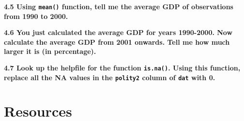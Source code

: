 \documentclass[]{book}
\newenvironment{Shaded}{\begin{snugshade}}{\end{snugshade}}
\newcommand{\KeywordTok}[1]{\textcolor[rgb]{0.13,0.29,0.53}{\textbf{#1}}}
\newcommand{\DataTypeTok}[1]{\textcolor[rgb]{0.13,0.29,0.53}{#1}}
\newcommand{\DecValTok}[1]{\textcolor[rgb]{0.00,0.00,0.81}{#1}}
\newcommand{\FloatTok}[1]{\textcolor[rgb]{0.00,0.00,0.81}{#1}}
\newcommand{\StringTok}[1]{\textcolor[rgb]{0.31,0.60,0.02}{#1}}
\newcommand{\CommentTok}[1]{\textcolor[rgb]{0.56,0.35,0.01}{\textit{#1}}}
\newcommand{\OperatorTok}[1]{\textcolor[rgb]{0.81,0.36,0.00}{\textbf{#1}}}
\newcommand{\NormalTok}[1]{#1}
\begin{document}
\textbf{4.5 Using \texttt{mean()} function, tell me the average GDP of
observations from 1990 to 2000.}

\begin{Shaded}
\end{Shaded}

\textbf{4.6 You just calculated the average GDP for years 1990-2000. Now
calculate the average GDP from 2001 onwards. Tell me how much larger it
is (in percentage).}

\begin{Shaded}
\end{Shaded}

\textbf{4.7 Look up the helpfile for the function \texttt{is.na()}.
Using this function, replace all the NA values in the \texttt{polity2}
column of \texttt{dat} with 0.}

\begin{Shaded}
\end{Shaded}

\part{Resources}\label{part-resources}
\end{document}
